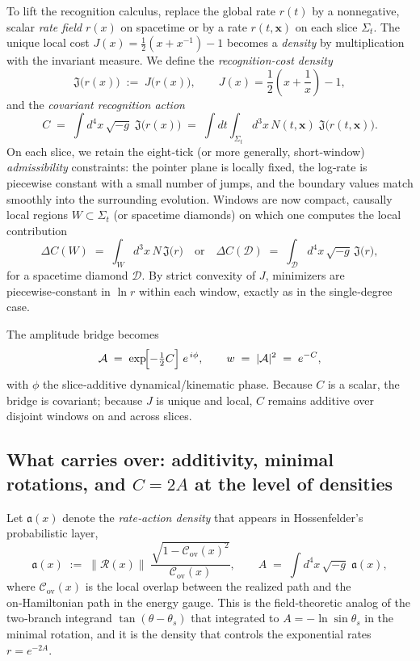\documentclass[11pt,letterpaper]{article}
\theoremstyle{definition}
\begin{document}
To lift the recognition calculus, replace the global rate \(r(t)\) by a nonnegative, scalar \emph{rate field} \(r(x)\) on spacetime or by a rate \(r(t,\mathbf x)\) on each slice \(\Sigma_t\). The unique local cost \(J(x)=\tfrac12(x+x^{-1})-1\) becomes a \emph{density} by multiplication with the invariant measure. We define the \emph{recognition‑cost density}
\begin{equation}
\mathfrak J\bigl(r(x)\bigr)\;:=\;J\!\bigl(r(x)\bigr),
\qquad
J(x)=\frac12\!\left(x+\frac1x\right)-1,
\end{equation}
and the \emph{covariant recognition action}
\begin{equation}
C \;=\; \int d^4x\,\sqrt{-g}\;\mathfrak J\bigl(r(x)\bigr)
\;=\; \int dt \int_{\Sigma_t} d^3x\,N(t,\mathbf x)\; \mathfrak J\bigl(r(t,\mathbf x)\bigr).
\end{equation}
On each slice, we retain the eight‑tick (or more generally, short‑window) \emph{admissibility} constraints: the pointer plane is locally fixed, the log‑rate is piecewise constant with a small number of jumps, and the boundary values match smoothly into the surrounding evolution. Windows are now compact, causally local regions \(W \subset \Sigma_t\) (or spacetime diamonds) on which one computes the local contribution
\begin{equation}
\Delta C(W)\;=\;\int_{W} d^3x\,N\, \mathfrak J\bigl(r\bigr)
\quad \text{or} \quad
\Delta C(\mathcal D)\;=\;\int_{\mathcal D} d^4x\,\sqrt{-g}\, \mathfrak J\bigl(r\bigr),
\end{equation}
for a spacetime diamond \(\mathcal D\). By strict convexity of \(J\), minimizers are piecewise‑constant in \(\ln r\) within each window, exactly as in the single‑degree case.

The amplitude bridge becomes
\begin{equation}
\mathcal A \;=\; \exp\!\Bigl[-\tfrac12 C\Bigr]\;e^{\,i\phi},
\qquad
w\;=\;|\mathcal A|^2\;=\;e^{-C},
\end{equation}
with \(\phi\) the slice‑additive dynamical/kinematic phase. Because \(C\) is a scalar, the bridge is covariant; because \(J\) is unique and local, \(C\) remains additive over disjoint windows on and across slices.

\subsection{What carries over: additivity, minimal rotations, and \(C=2A\) at the level of densities}

Let \(\mathfrak a(x)\) denote the \emph{rate‑action density} that appears in Hossenfelder’s probabilistic layer,
\begin{equation}
\mathfrak a(x)\;:=\;\bigl\|\mathcal R(x)\bigr\|\;\frac{\sqrt{1-\mathcal C_{\mathrm{ov}}(x)^2}}{\mathcal C_{\mathrm{ov}}(x)},
\qquad
A\;=\;\int d^4x\,\sqrt{-g}\;\mathfrak a(x),
\end{equation}
where \(\mathcal C_{\mathrm{ov}}(x)\) is the local overlap between the realized path and the on‑Hamiltonian path in the energy gauge. This is the field‑theoretic analog of the two‑branch integrand \(\tan(\theta-\theta_s)\) that integrated to \(A=-\ln\sin\theta_s\) in the minimal rotation, and it is the density that controls the exponential rates \(r=e^{-2A}\).
\end{document}
